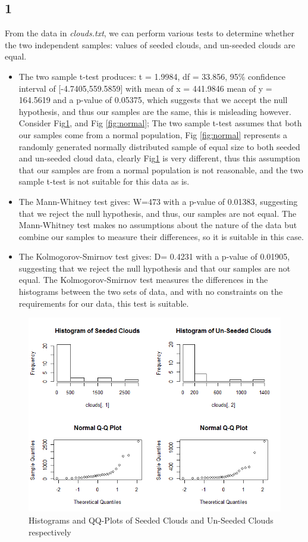 \documentclass{article}
\begin{document}
    \subsection*{1}
    From the data in \textit{clouds.txt}, we can perform various tests to determine whether the two independent samples: values of seeded clouds, and un-seeded clouds are equal.
    \begin{itemize}
    \item The two sample t-test produces: t = 1.9984, df = 33.856, 95\% confidence interval of [-4.7405,559.5859] with mean of x = 441.9846 mean of y = 164.5619 and a p-value of 0.05375, which suggests that we accept the null hypothesis, and thus our samples are the same, this is misleading however. Consider Fig\ref{fig:clouds}, and Fig \ref{fig:normal}; The two sample t-test assumes that both our samples come from a normal population, Fig \ref{fig:normal} represents a randomly generated normally distributed sample of equal size to both seeded and un-seeded cloud data, clearly Fig\ref{fig:clouds} is very different, thus this assumption that our samples are from a normal population is not reasonable, and the two sample t-test is not suitable for this data as is.
    \item The Mann-Whitney test gives: W=473 with a p-value of 0.01383, suggesting that we reject the null hypothesis, and thus, our samples are not equal. The Mann-Whitney test makes no assumptions about the nature of the data but combine our samples to measure their differences, so it is suitable in this case.
    \item The Kolmogorov-Smirnov test gives: D= 0.4231 with a p-value of 0.01905, suggesting that we reject the null hypothesis and that our samples are not equal. The Kolmogorov-Smirnov test measures the differences in the histograms between the two sets of data, and with no constraints on the requirements for our data, this test is suitable.
    \end{itemize}
    
    \begin{figure}[H]
      \includegraphics[scale=0.5]{../results/2_1.png}
      \caption{Histograms and QQ-Plots of Seeded Clouds and Un-Seeded Clouds respectively}
      \label{fig:clouds}
    \end{figure}
     
\end{document}
